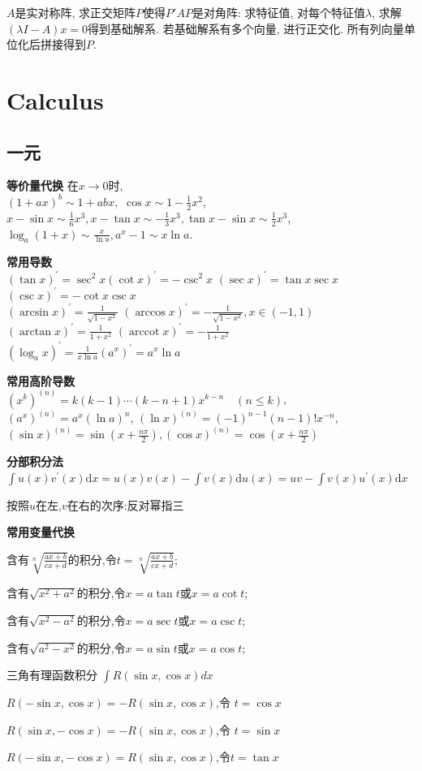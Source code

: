 \documentclass[UTF8]{ctexart}
\begin{document}
$A$是实对称阵, 求正交矩阵$P$使得$P'AP$是对角阵:
求特征值, 对每个特征值$\lambda$, 求解$(\lambda I-A)x=0$得到基础解系.
若基础解系有多个向量, 进行正交化.
所有列向量单位化后拼接得到$P$.

\section{Calculus}

\subsection{一元}

\noindent \textbf{等价量代换}  \quad 在$x\to0$时, \\
$(1+ax)^b\sim 1+abx,$
$\cos x\sim 1-\frac{1}{2}x^2$, 
$x-\sin x\sim \frac{1}{6}x^3,x-\tan x\sim -\frac{1}{3}x^3,
\tan x-\sin x\sim \frac{1}{2}x^3$, \\
$\log_a(1+x)\sim \frac{x}{\ln a},a^x-1\sim x\ln a$.


\noindent \textbf{常用导数}\\
$(\tan x)^{\prime}=\sec ^{2} x $\qquad $ (\cot x)^{\prime}=-\csc ^{2} x $\qquad
$(\sec x)^{\prime}=\tan x \sec x $\qquad $ (\csc x)^{\prime}=-\cot x \csc x $\\
$(\arcsin x)^{\prime}=\frac{1}{\sqrt{1-x^{2}}}$
\qquad $(\arccos x)^{\prime}=-\frac{1}{\sqrt{1-x^{2}}}, x \in(-1,1) $\\
$(\arctan x)^{\prime}=\frac{1}{1+x^{2}} $
\qquad $(\operatorname{arccot} x)^{\prime}=-\frac{1}{1+x^{2}} $\\ 
$\left(\log _{a} x\right)^{\prime}=\frac{1}{x \ln a}$\qquad $\left(a^{x}\right)^{\prime}=a^{x} \ln a$


\noindent \textbf{常用高阶导数}\\
$\left(x^{k}\right)^{(n)}=k(k-1) \cdots(k-n+1) x^{k-n} \quad(n \leq k)$,\\
$\left(a^{x}\right)^{(n)}=a^{x}(\ln a)^{n}$,
$(\ln x)^{(n)}=(-1)^{n-1}(n-1) ! x^{-n}$, \\
$(\sin x)^{(n)}=\sin \left(x+\frac{n \pi}{2}\right),
(\cos x)^{(n)}=\cos \left(x+\frac{n \pi}{2}\right)$


\noindent \textbf{分部积分法}
$\int u(x) v^{\prime}(x) \mathrm{d} x= u(x) v(x)-\int v(x) \mathrm{d} u(x) =u v-\int v(x) u^{\prime}(x) \mathrm{d} x$
\par 按照$u$在左,$v$在右的次序:反对幂指三


\noindent \textbf{常用变量代换}\par 
含有$\sqrt[n]{\frac{ax+b}{cx+d}}$的积分,令$t=\sqrt[n]{\frac{a x+b}{c x+d}}$;\par 
含有$\sqrt{x^{2}+a^{2}}$的积分,令$x=a \tan t$或$x=a \cot t$;\par 
含有$\sqrt{x^{2}-a^{2}}$的积分,令$x=a \sec t$或$x=a \csc t$;\par 
含有$\sqrt{a^{2}-x^{2}}$的积分,令$x=a \sin t$或$x=a \cos t$;\par
三角有理函数积分 $\int R(\sin x, \cos x) dx$\par 
$R(-\sin x, \cos x)=-R(\sin x, \cos x)$,令 $t=\cos x $\par 
$R(\sin x,-\cos x)=-R(\sin x, \cos x)$,令 $t=\sin x $\par 
$R(-\sin x,-\cos x)=R(\sin x, \cos x)$,令$t=\tan x$
\end{document}
